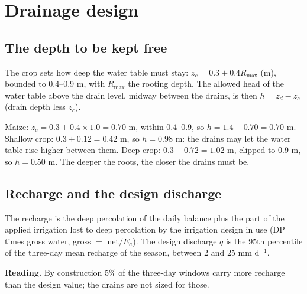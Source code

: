 \chapter{Drainage design}\label{ch:drain}

\section{The depth to be kept free}
The crop sets how deep the water table must stay: $z_c=0.3+0.4R_{\max}$ (m), bounded to 0.4--0.9 m, with $R_{\max}$ the rooting depth. The allowed head of the water table above the drain level, midway between the drains, is then $h=z_d-z_c$ (drain depth less $z_c$).

\sol  Maize: $z_c=0.3+0.4\times1.0=0.70$ m, within 0.4--0.9, so $h=1.4-0.70=0.70$ m. Shallow crop: $0.3+0.12=0.42$ m, so $h=0.98$ m: the drains may let the water table rise higher between them. Deep crop: $0.3+0.72=1.02$ m, clipped to 0.9 m, so $h=0.50$ m. The deeper the roots, the closer the drains must be.


\section{Recharge and the design discharge}
The recharge is the deep percolation of the daily balance plus the part of the applied irrigation lost to deep percolation by the irrigation design in use (DP times gross water, gross $=$ net$/E_a$). The design discharge $q$ is the 95th percentile of the three-day mean recharge of the season, between 2 and 25 mm d$^{-1}$.

\textbf{Reading.} By construction 5\% of the three-day windows carry more recharge than the design value; the drains are not sized for those.


